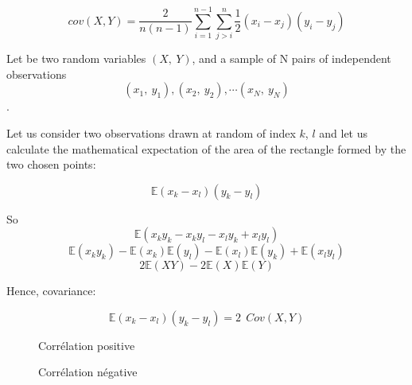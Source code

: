 \documentclass[
]{report}
\begin{document}
\[cov(X,Y)= \frac{2}{n(n-1)}\sum_{i=1}^{n-1}\sum_{j>i}^{n}\frac{1}{2}(x_i-x_j)(y_i - y_j)\]

Let be two random variables \((X,~Y)\), and a sample of N pairs of independent observations
\[(x_1,~y_1),(x_2,~y_2),\dotsi (x_N,~y_N)\].

Let us consider two observations drawn at random of index \(k\), \(l\) and let us calculate the mathematical expectation of the area of the rectangle formed by the two chosen points:

\[\mathbb{E}(x_k-x_l)(y_k-y_l)\]

So
\[\mathbb{E}(x_ky_k-x_ky_l-x_ly_k+x_ly_l)\]
\[\mathbb{E}(x_ky_k) -\mathbb{E}(x_k)\mathbb{E}(y_l) -\mathbb{E}(x_l)\mathbb{E}(y_k)+ \mathbb{E}(x_ly_l)\]
\[2\mathbb{E}(XY)-2\mathbb{E}(X)\mathbb{E}(Y)\]

Hence, covariance:

\[\mathbb{E}(x_k-x_l)(y_k-y_l)= 2~~ Cov(X,Y)\]

\begin{paracol}{2}
    \begin{leftcolumn}
\begin{figure} 
\caption{Corr\'elation positive}
\end{figure}
 \end{leftcolumn}
  \begin{rightcolumn} %
  \begin{figure}
\caption{Corr\'elation n\'egative}
\end{figure}
    \end{rightcolumn}
\end{paracol}
\end{document}
